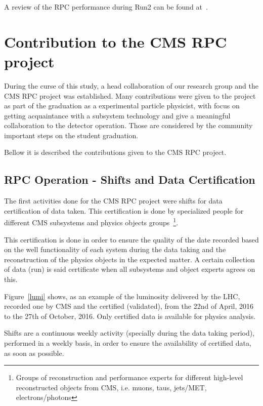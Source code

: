 A review of the RPC performance during Run2 can be found at~\cite{rpc_run2_performance}.

\section{Contribution to the CMS RPC project}

During the curse of this study, a head collaboration of our research group and the CMS RPC project was established. Many contributions were given to the project as part of the graduation as a experimental particle physicist, with focus on getting acquaintance with a subsystem technology and give a meaningful collaboration to the detector operation.  Those are considered by the community important steps on the student graduation.

Bellow it is described the contributions given to the CMS RPC project.

\subsection{RPC Operation - Shifts and Data Certification}

The first activities done for the CMS RPC project were shifts for data certification of data taken. This certification is done by specialized people for different CMS subsystems and physics objects groups~\footnote{Groups of reconstruction and performance experts for different high-level reconstructed objects from CMS, i.e. muons, taus, jets/MET, electrons/photons}. 
 
This certification is done in order to ensure the quality of the date recorded based on the well functionality of each system during the data taking and the reconstruction of the physics objects in the expected matter. A certain collection of data (run) is said certificate when all subsystems and object experts agrees on this.

Figure~\ref{lumi} shows, as an example of the luminosity delivered by the LHC, recorded one by CMS and the certified (validated), from the 22nd of April, 2016 to the 27th of October, 2016. Only certified data is available for physics analysis.

Shifts are a continuous weekly activity (specially during the data taking period), performed in a weekly basis, in order to ensure the availability of certified data, as soon as possible.  

